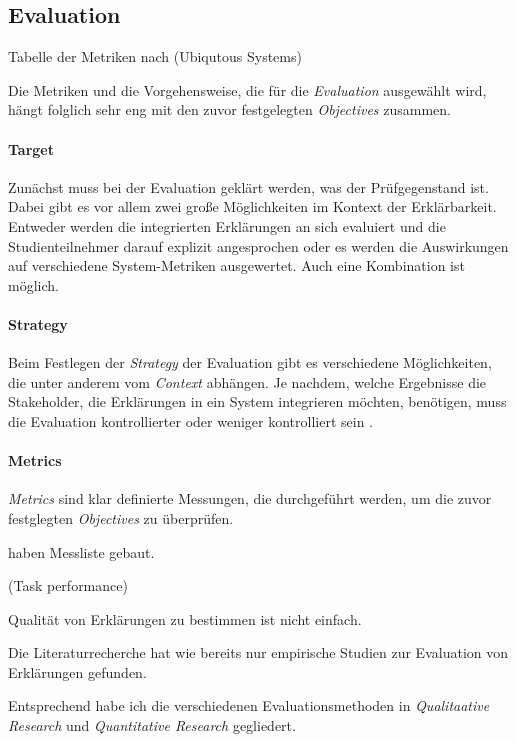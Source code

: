 \subsection{Evaluation}
\label{sec:model_evaluation_description}

Tabelle der Metriken nach \cite{carvalho2017quality} (Ubiqutous Systems)

Die Metriken und die Vorgehensweise, die für die \textit{Evaluation} ausgewählt wird, hängt folglich sehr eng mit den zuvor festgelegten \textit{Objectives} zusammen.

\paragraph{Target} Zunächst muss bei der Evaluation geklärt werden, was der Prüfgegenstand ist. Dabei gibt es vor allem zwei große Möglichkeiten im Kontext der Erklärbarkeit. Entweder werden die integrierten Erklärungen an sich evaluiert und die Studienteilnehmer darauf explizit angesprochen oder es werden die Auswirkungen auf verschiedene System-Metriken ausgewertet. Auch eine Kombination ist möglich.

\paragraph{Strategy} Beim Festlegen der \textit{Strategy} der Evaluation gibt es verschiedene Möglichkeiten, die unter anderem vom \textit{Context} abhängen. Je nachdem, welche Ergebnisse die Stakeholder, die Erklärungen in ein System integrieren möchten, benötigen, muss die Evaluation kontrollierter oder weniger kontrolliert sein \cite[vgl.][]{wohlin2012experimentation}.

\paragraph{Metrics} \textit{Metrics} sind klar definierte Messungen, die durchgeführt werden, um die zuvor festglegten \textit{Objectives} zu überprüfen.

\cite{tintarev_designing_nodate} haben Messliste gebaut.

(Task performance) \cite{martin_evaluating_2021}

Qualität von Erklärungen zu bestimmen ist nicht einfach.

Die Literaturrecherche hat wie bereits \cite{nunes_systematic_2017} nur empirische Studien zur Evaluation von Erklärungen gefunden.

Entsprechend \cite{wohlin2012experimentation} habe ich die verschiedenen Evaluationsmethoden in \textit{Qualitaative Research} und \textit{Quantitative Research} gegliedert.

